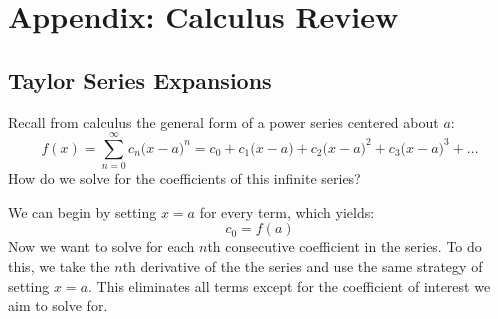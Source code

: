 \chapter{Appendix: Calculus Review}
\section{Taylor Series Expansions}
Recall from calculus the general form of a power series centered about $a$:
    \begin{equation}
        f(x) = \sum_{n=0}^{\infty} c_n {\big(x - a\big)}^n = c_0 + c_1{\big(x - a\big)}
            + c_2{\big(x - a\big)}^2 + c_3{\big(x - a\big)}^3 + ...
        \label{eq:power_series}
    \end{equation}
How do we solve for the coefficients of this infinite series?

\vspace{0.5cm}
\noindent
We can begin by setting $x = a$ for every term, which yields:
    \begin{equation}
        c_0 = f(a)
        \label{eq:power_first}
    \end{equation}
Now we want to solve for each $n$th consecutive coefficient in the series.  To do this, we take the $n$th derivative of the the series and use the same strategy of setting $x = a$.  This eliminates all terms except for the coefficient of interest we aim to solve for.

